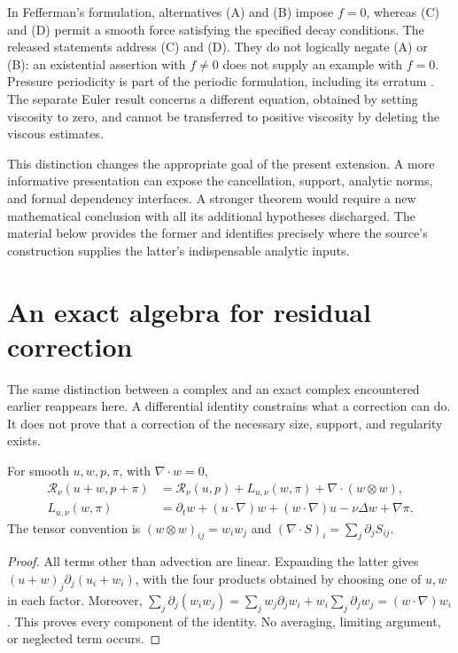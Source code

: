 In Fefferman's formulation, alternatives (A) and (B) impose $f=0$, whereas
(C) and (D) permit a smooth force satisfying the specified decay conditions.
The released statements address (C) and (D). They do not logically negate (A)
or (B): an existential assertion with $f\neq0$ does not supply an example with
$f=0$. Pressure periodicity is part of the periodic formulation, including its
erratum \citep{NSFefferman}. The separate Euler result concerns a different
equation, obtained by setting viscosity to zero, and cannot be transferred to
positive viscosity by deleting the viscous estimates.

This distinction changes the appropriate goal of the present extension. A
more informative presentation can expose the cancellation, support, analytic
norms, and formal dependency interfaces. A stronger theorem would require a
new mathematical conclusion with all its additional hypotheses discharged.
The material below provides the former and identifies precisely where the
source's construction supplies the latter's indispensable analytic inputs.

\section{An exact algebra for residual correction}

The same distinction between a complex and an exact complex encountered
earlier reappears here. A differential identity constrains what a correction
can do. It does not prove that a correction of the necessary size, support,
and regularity exists.

\begin{proposition}
\label{prop:ns-residual-increment}
For smooth $u,w,p,\pi$, with $\nabla\cdot w=0$,
\begin{align*}
 \mathcal R_\nu(u+w,p+\pi)
 &=\mathcal R_\nu(u,p)+L_{u,\nu}(w,\pi)
       +\nabla\cdot(w\otimes w),\\
 L_{u,\nu}(w,\pi)
 &=\partial_tw+(u\cdot\nabla)w+(w\cdot\nabla)u
       -\nu\Delta w+\nabla\pi .
\end{align*}
The tensor convention is $(w\otimes w)_{ij}=w_iw_j$ and
$(\nabla\cdot S)_i=\sum_j\partial_jS_{ij}$.
\end{proposition}
\begin{proof}
All terms other than advection are linear. Expanding the latter gives
$(u+w)_j\partial_j(u_i+w_i)$, with the four products obtained by choosing
one of $u,w$ in each factor. Moreover,
$\sum_j\partial_j(w_iw_j)=\sum_jw_j\partial_jw_i+
w_i\sum_j\partial_jw_j=(w\cdot\nabla)w_i$. This proves every component
of the identity. No averaging, limiting argument, or neglected term occurs.
\end{proof}


